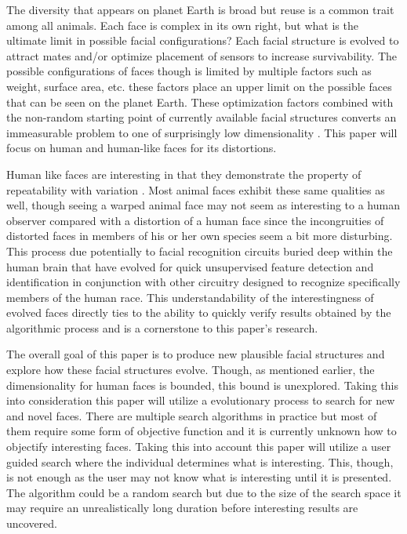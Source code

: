 The diversity that appears on planet Earth is broad but reuse is a common trait among all animals. Each face is 
complex in its own right, but what is the ultimate limit in possible facial configurations? Each facial structure
is evolved to attract mates and/or optimize placement of sensors to increase survivability. The possible configurations
of faces though is limited by multiple factors such as weight, surface area, etc. these factors place an upper limit
on the possible faces that can be seen on the planet Earth. These optimization factors combined with the non-random 
starting point of currently available facial structures converts an immeasurable problem to one of surprisingly low
dimensionality \cite{sirovich1987low}. This paper will focus on human and human-like faces for its distortions.

Human like faces are interesting in that they demonstrate the property of repeatability with variation \cite{stanley2007compositional}.
Most animal faces exhibit these same qualities as well, though seeing a warped animal face may not seem as interesting to
a human observer compared with a distortion of a human face since the incongruities of distorted faces in members of his or her own
species seem a bit more disturbing. This process due potentially to facial recognition circuits buried deep within the human brain that have evolved
for quick unsupervised feature detection and identification in conjunction with other circuitry designed to recognize specifically members of
the human race. This understandability of the interestingness of evolved faces directly ties to the ability to quickly verify
results obtained by the algorithmic process and is a cornerstone to this paper's research.

The overall goal of this paper is to produce new plausible facial structures and explore how these facial structures evolve. Though,
as mentioned earlier, the dimensionality for human faces is bounded, this bound is unexplored. Taking this into consideration
this paper will utilize a evolutionary process to search for new and novel faces. There are multiple search algorithms
in practice but most of them require some form of objective function and it is currently unknown how to objectify interesting faces.
Taking this into account this paper will utilize a user guided search where the individual determines what is interesting. This, though,
is not enough as the user may not know what is interesting until it is presented. The algorithm could be a random search but due to the
size of the search space it may require an unrealistically long duration before interesting results are uncovered. 

